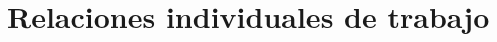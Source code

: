 \documentclass[../main.tex]{subfiles}
\begin{document}
\chapter{Relaciones individuales de trabajo}
\end{document}

